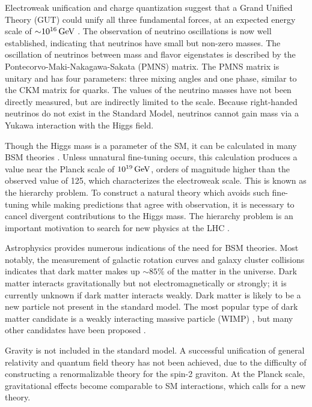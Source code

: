 Electroweak unification and charge quantization suggest that a Grand Unified Theory (GUT) could unify all three fundamental forces, at an expected energy scale of ${\sim} 10^{16}\,\text{Ge\hspace{-.08em}V}$ \cite{PhysRevLett.33.451}. The observation of neutrino oscillations is now well established, indicating that neutrinos have small but non-zero masses. The oscillation of neutrinos between mass and flavor eigenstates is described by the Pontecorvo-Maki-Nakagawa-Sakata (PMNS) matrix. The PMNS matrix is unitary and has four parameters: three mixing angles and one phase, similar to the CKM matrix for quarks. The values of the neutrino masses have not been directly measured, but are indirectly limited to the \eVns scale. Because right-handed neutrinos do not exist in the Standard Model, neutrinos cannot gain mass via a Yukawa interaction with the Higgs field.

Though the Higgs mass is a parameter of the SM, it can be calculated in many BSM theories \cite{Susskind1984181}. Unless unnatural fine-tuning occurs, this calculation produces a value near the Planck scale of $10^{19}\,\text{Ge\hspace{-.08em}V}$, orders of magnitude higher than the observed value of 125\GeV, which characterizes the electroweak scale. This is known as the hierarchy problem. To construct a natural theory which avoids such fine-tuning while making predictions that agree with observation, it is necessary to cancel divergent contributions to the Higgs mass. The hierarchy problem is an important motivation to search for new physics at the LHC \cite{Morrissey20121}.

Astrophysics provides numerous indications of the need for BSM theories. Most notably, the measurement of galactic rotation curves and galaxy cluster collisions \cite{BulletCluster} indicates that dark matter makes up ${\sim} 85\%$ of the matter in the universe. Dark matter interacts gravitationally but not electromagnetically or strongly; it is currently unknown if dark matter interacts weakly. Dark matter is likely to be a new particle not present in the standard model. The most popular type of dark matter candidate is a weakly interacting massive particle (WIMP) \cite{Morrissey20121}, but many other candidates have been proposed \cite{PDG}.

Gravity is not included in the standard model. A successful unification of general relativity and quantum field theory has not been achieved, due to the difficulty of constructing a renormalizable theory for the spin-2 graviton. At the Planck scale, gravitational effects become comparable to SM interactions, which calls for a new theory.

